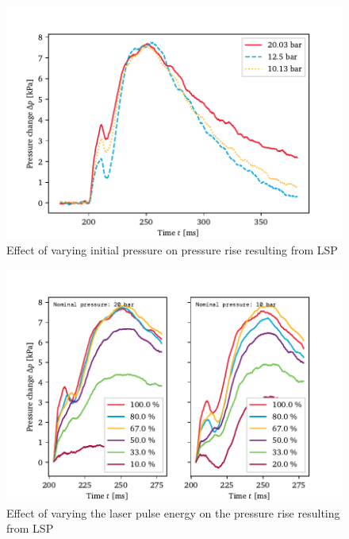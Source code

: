     \begin{figure}[h]
        \centering
        \includegraphics[]{assets/5 results/pressure_pressures.pdf}
        \caption{Effect of varying initial pressure on pressure rise resulting from LSP}
        \label{fig:pressure_pressures}
    \end{figure}

    \begin{figure}[h]
        \centering
        \includegraphics[]{assets/5 results/pressure_powers.pdf}
        \caption{Effect of varying the laser pulse energy on the pressure rise resulting from LSP}
        \label{fig:pressure_powers}
    \end{figure}

